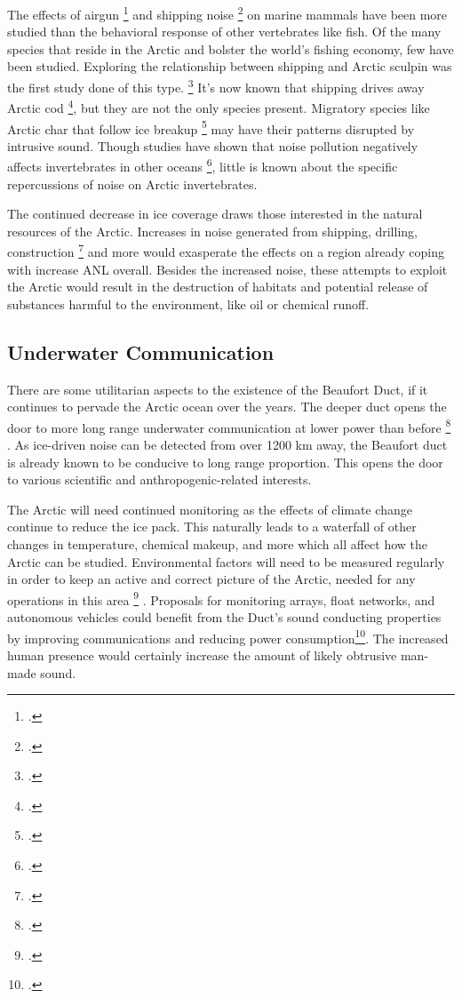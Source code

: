 The effects of airgun \footcite[]{halliday2020potential} and shipping noise \footcite[]{halliday2017potential} on marine mammals have been more studied than the behavioral response of other vertebrates like fish. Of the many species that reside in the Arctic and bolster the world's fishing economy, few have been studied. Exploring the relationship between shipping and Arctic sculpin was the first study done of this type. \footcite[]{ivanova2018sculpin} It's now known that shipping drives away Arctic cod \footcite[]{ivanova2020shipping}, but they are not the only species present. Migratory species like Arctic char that follow ice breakup \footcite[]{hammer2021char} may have their patterns disrupted by intrusive sound. Though studies have shown that noise pollution negatively affects invertebrates in other oceans \footcite[]{difranco2020}, little is known about the specific repercussions of noise on Arctic invertebrates.

The continued decrease in ice coverage draws those interested in the natural resources of the Arctic. Increases in noise generated from shipping, drilling, construction \footcite[]{gering2020aca} and more would exasperate the effects on a region already coping with increase ANL overall. Besides the increased noise, these attempts to exploit the Arctic would result in the destruction of habitats and potential release of substances harmful to the environment, like oil or chemical runoff.


\subsection{Underwater Communication}
There are some utilitarian aspects to the existence of the Beaufort Duct, if it continues to pervade the Arctic ocean over the years. The deeper duct opens the door to more long range underwater communication at lower power than before \footcite[]{freitag2015underwatercomms} . As ice-driven noise can be detected from over 1200 km away, the Beaufort duct is already known to be conducive to long range proportion. This opens the door to various scientific and anthropogenic-related interests.

The Arctic will need continued monitoring as the effects of climate change continue to reduce the ice pack. This naturally leads to a waterfall of other changes in temperature, chemical makeup, and more which all affect how the Arctic can be studied. Environmental factors will need to be measured regularly in order to keep an active and correct picture of the Arctic, needed for any operations in this area \footcite[]{Schmidt2016commnav} . Proposals for monitoring arrays, float networks, and autonomous vehicles could benefit from the Duct's sound conducting properties by improving communications and reducing power consumption\footcite[]{kukulya2016development}. The increased human presence would certainly increase the amount of likely obtrusive man-made sound.


